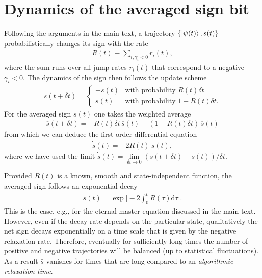 \documentclass[twocolumn,prl,superscriptaddress]{revtex4-2}
\begin{document}
\section{Dynamics of the averaged sign bit}
Following the arguments in the main text, a trajectory $\{ \ket{ \psi(t)}, s(t) \}$ probabilistically changes its sign with the rate 
\begin{align}
	R(t) \equiv \sum_{i, \gamma_i < 0} r_i(t),
\end{align}
where the sum runs over all jump rates $r_i(t)$ that correspond to a negative $\gamma_i<0$. The dynamics of the sign then follows the update scheme 
\begin{align}
	s(t + \delta t) = \begin{cases}
		-s(t) & \text{with probability } R(t) \delta t \\
		s(t) & \text{with probability } 1 - R(t) \delta t. 
	\end{cases}
\end{align}
For the averaged sign $\overline s(t)$ one takes the weighted average
\begin{align}
	\overline s(t+\delta t) = - R(t)\delta t\, \overline s(t) + \left( 1-R(t) \delta t \right) \, \overline s(t) 
\end{align}
from which we can deduce the first order differential equation
\begin{align}
	\dot{\overline{s}}(t) = - 2 R(t)\ \overline{s}(t),
\end{align}
where we have used the limit $\dot{\overline{s}}(t)=\lim\limits_{\delta t\to 0} (s(t+\delta t) - s(t))/\delta t$.

Provided $R(t)$ is a known, smooth and state-independent function, the averaged sign follows an exponential decay 
\begin{align}
	\overline{s}(t) = \exp\Big[-2 \int_0^t R(\tau) \mathrm d \tau \Big].
\end{align}
This is the case, e.g., for the eternal master equation discussed in the main text. However, even if the decay rate depends on the particular state, qualitatively the net sign decays exponentially on a time scale that is given by the negative relaxation rate. Therefore, eventually for sufficiently long times the number of positive and negative trajectories will be balanced (up to statistical fluctuations). As a result $\bar{s}$ vanishes for times that are long compared to an \emph{algorithmic relaxation time}.
\end{document}
